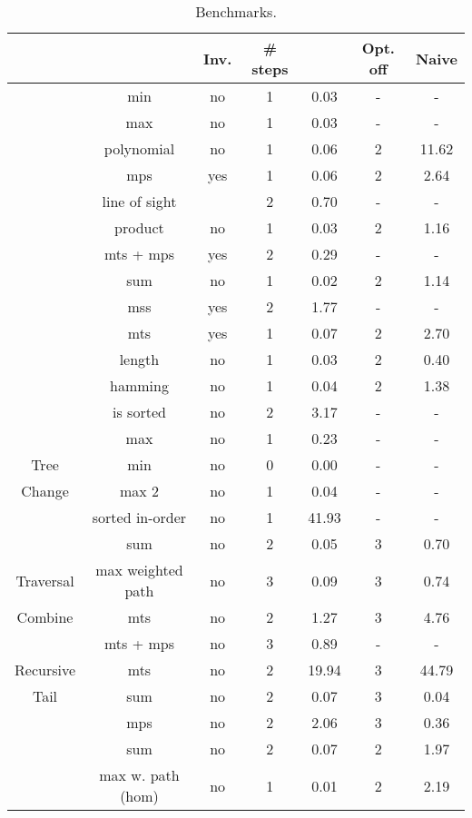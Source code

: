\begin{table}
	\caption{Benchmarks. }\label{table:experiments}
	{
		\begin{tabular}[h]{|c|c|c|c|c|c|c|}
			\hline
			 &   & Inv. & \# steps & \tool  & Opt. off & Naive \\ 
			\hline
			 & min & no & 1 & 0.03 & - & -\\ 
			 & max & no & 1 & 0.03 & - & -\\ 
			 & polynomial & no & 1 & 0.06 & 2 & 11.62\\ 
			 & mps & yes & 1 & 0.06 & 2 & 2.64\\ 
			 & line of sight &  & 2 & 0.70 & - & -\\ 
			 & product & no & 1 & 0.03 & 2 & 1.16\\ 
			 & mts + mps & yes & 2 & 0.29 & - & -\\ 
			 & sum & no & 1 & 0.02 & 2 & 1.14\\ 
			 & mss & yes & 2 & 1.77 & - & -\\ 
			 & mts & yes & 1 & 0.07 & 2 & 2.70\\ 
			 & length & no & 1 & 0.03 & 2 & 0.40\\ 
			 & hamming & no & 1 & 0.04 & 2 & 1.38\\ 
			 & is sorted & no & 2 & 3.17 & - & -\\ 
			\hline
			 & max & no & 1 & 0.23 & - & -\\ 
			Tree & min & no & 0 & 0.00 & - & -\\ 
			Change & max 2 & no & 1 & 0.04 & - & -\\ 
			 & sorted in-order & no & 1 & 41.93 & - & -\\ 
			 & sum & no & 2 & 0.05 & 3 & 0.70\\ 
			Traversal & max weighted path & no & 3 & 0.09 & 3 & 0.74\\ 
			\hline
			Combine & mts & no & 2 & 1.27 & 3 & 4.76\\ 
			 & mts + mps & no & 3 & 0.89 & - & -\\ 
			\hline
			Recursive & mts & no & 2 & 19.94 & 3 & 44.79\\ 
			Tail & sum & no & 2 & 0.07 & 3 & 0.04\\ 
			 & mps & no & 2 & 2.06 & 3 & 0.36\\ 
			\hline
			 & sum & no & 2 & 0.07 & 2 & 1.97\\ 
			 & max w. path (hom) & no & 1 & 0.01 & 2 & 2.19\\ 

\end{tabular}}
\end{table}
